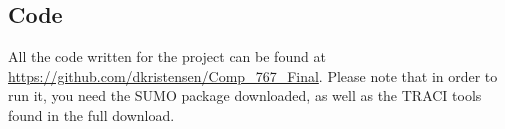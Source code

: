 \documentclass[12pt,twocolumn]{article}
\begin{document}
\subsection{Code}
\label{sec:github}
All the code written for the project can be found at \url{https://github.com/dkristensen/Comp_767_Final}. Please note that in order to run it, you need the SUMO package downloaded, as well as the TRACI tools found in the full download.




\end{document}
